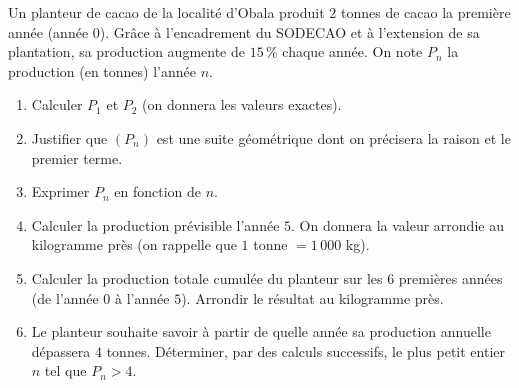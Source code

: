 \documentclass[11pt]{article}
\begin{document}
\begin{exercice}
Un planteur de cacao de la localité d'Obala produit $2$ tonnes de cacao la première année (année $0$). Grâce à l'encadrement du SODECAO et à l'extension de sa plantation, sa production augmente de $15\,\%$ chaque année. On note $P_n$ la production (en tonnes) l'année $n$.
\begin{enumerate}
\item Calculer $P_1$ et $P_2$ (on donnera les valeurs exactes).
\item Justifier que $(P_n)$ est une suite géométrique dont on précisera la raison et le premier terme.
\item Exprimer $P_n$ en fonction de $n$.
\item Calculer la production prévisible l'année $5$. On donnera la valeur arrondie au kilogramme près (on rappelle que $1$ tonne $= 1\,000$ kg).
\item Calculer la production totale cumulée du planteur sur les 6 premières années (de l'année $0$ à l'année $5$). Arrondir le résultat au kilogramme près.
\item Le planteur souhaite savoir à partir de quelle année sa production annuelle dépassera $4$ tonnes. Déterminer, par des calculs successifs, le plus petit entier $n$ tel que $P_n > 4$.
\end{enumerate}
\end{exercice}
\end{document}
